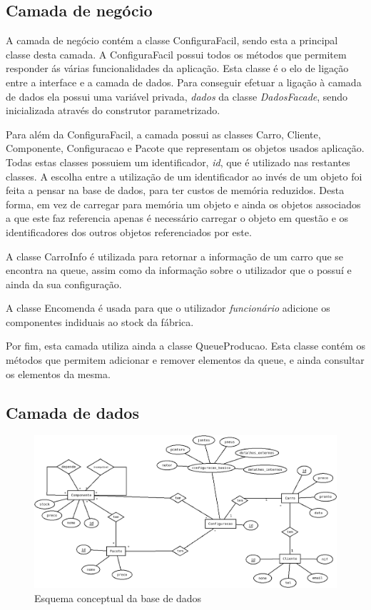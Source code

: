 \documentclass{llncs}
\newcommand\tab[1][0.5cm]{\hspace*{#1}}
\begin{document}
\subsection{Camada de negócio}

A camada de negócio contém a classe ConfiguraFacil, sendo esta a principal classe desta camada. A ConfiguraFacil possui todos os métodos que permitem responder ás várias funcionalidades da aplicação. Esta classe é o elo de ligação entre a interface e a camada de dados. Para conseguir efetuar a ligação à camada de dados ela possui uma variável privada, \textit{dados} da classe \textit{DadosFacade}, sendo inicializada através do construtor parametrizado.

\tab Para além da ConfiguraFacil, a camada possui as classes Carro, Cliente, Componente, Configuracao e Pacote que representam os objetos usados aplicação. Todas estas classes possuiem um identificador, \textit{id}, que é utilizado nas restantes classes. A escolha entre a utilização de um identificador ao invés de um objeto foi feita a pensar na base de dados, para ter custos de memória reduzidos. Desta forma, em vez de carregar para memória um objeto e ainda os objetos associados a que este faz referencia apenas é necessário carregar o objeto em questão e os identificadores dos outros objetos referenciados por este. 

\tab A classe CarroInfo é utilizada para retornar a informação de um carro que se encontra na queue, assim como da informação sobre o utilizador que o possuí e ainda da sua configuração.

\tab A classe Encomenda é usada para que o utilizador \textit{funcionário} adicione os componentes indiduais ao stock da fábrica.

\tab Por fim, esta camada utiliza ainda a classe QueueProducao. Esta classe contém os métodos que permitem adicionar e remover elementos da queue, e ainda consultar os elementos da mesma.

\subsection{Camada de dados}

\begin{figure}
\begin{center}
\includegraphics[scale=0.33]{esquema_conceptual.png}
\end{center}
\caption{\label{fig:esquema_conceptual}Esquema conceptual da base de dados}
\end{figure}
\end{document}
